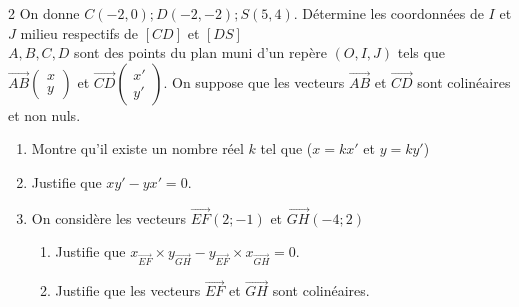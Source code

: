 \begin{multicols*}{2}
  	 On donne $C(-2, 0); D(-2, -2); S(5, 4)$. Détermine les coordonnées de $I$ et $J$ milieu respectifs de $[CD]$ et $[DS]$\\
  	$A, B, C, D$ sont des points du plan muni d'un repère $(O, I, J)$ tels que $\overrightarrow{AB}\begin{pmatrix} x \\ y \end{pmatrix}$ et $\overrightarrow{CD}\begin{pmatrix} x' \\ y' \end{pmatrix}$. On suppose que les vecteurs $\overrightarrow{AB}$ et $\overrightarrow{CD}$ sont colinéaires et non nuls.
  	\begin{enumerate}
  		\item Montre qu'il existe un nombre réel $k$ tel que ($x = kx'$ et $y = ky'$)
  		\item Justifie que  $xy' - yx' = 0$.
  		\item On considère les vecteurs $ \overrightarrow{EF}(2;-1) $ et $ \overrightarrow{GH}(-4;2) $
  		\begin{enumerate}
  			\item Justifie que $ x_{\overrightarrow{EF}}\times y_{\overrightarrow{GH}}-y_{\overrightarrow{EF}}\times x_{\overrightarrow{GH}}=0 $.
  			\item  Justifie que les vecteurs $ \overrightarrow{EF} $ et $ \overrightarrow{GH} $ sont colinéaires.
  		\end{enumerate}
  	\end{enumerate}
  	\dures
  	 
  	

\end{multicols*}

